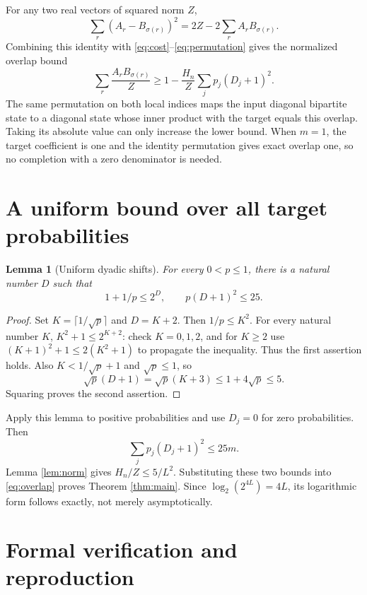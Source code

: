\documentclass[11pt]{article}
\newtheorem{lemma}[theorem]{Lemma}
\begin{document}
For any two real vectors of squared norm $Z$,
\[
 \sum_r(A_r-B_{\sigma(r)})^2=2Z-2\sum_rA_rB_{\sigma(r)}.
\]
Combining this identity with \eqref{eq:cost}--\eqref{eq:permutation} gives the normalized overlap bound
\begin{equation}
 \sum_r\frac{A_rB_{\sigma(r)}}Z
 \geq1-\frac{H_n}{Z}\sum_jp_j(D_j+1)^2.
 \label{eq:overlap}
\end{equation}
The same permutation on both local indices maps the input diagonal bipartite state to a diagonal state whose inner product with the target equals this overlap. Taking its absolute value can only increase the lower bound. When $m=1$, the target coefficient is one and the identity permutation gives exact overlap one, so no completion with a zero denominator is needed.

\section{A uniform bound over all target probabilities}

\begin{lemma}[Uniform dyadic shifts]\label{lem:shift}
For every $0<p\leq1$, there is a natural number $D$ such that
\[
 1+1/p\leq2^D,\qquad p(D+1)^2\leq25.
\]
\end{lemma}
\begin{proof}
Set $K=\lceil1/\sqrt p\rceil$ and $D=K+2$. Then $1/p\leq K^2$. For every natural number $K$, $K^2+1\leq2^{K+2}$: check $K=0,1,2$, and for $K\geq2$ use $(K+1)^2+1\leq2(K^2+1)$ to propagate the inequality. Thus the first assertion holds. Also $K<1/\sqrt p+1$ and $\sqrt p\leq1$, so
\[
 \sqrt p(D+1)=\sqrt p(K+3)\leq1+4\sqrt p\leq5.
\]
Squaring proves the second assertion.
\end{proof}

Apply this lemma to positive probabilities and use $D_j=0$ for zero probabilities. Then
\[
 \sum_jp_j(D_j+1)^2\leq25m.
\]
Lemma \ref{lem:norm} gives $H_n/Z\leq5/L^2$. Substituting these two bounds into \eqref{eq:overlap} proves Theorem \ref{thm:main}. Since $\log_2(2^{4L})=4L$, its logarithmic form follows exactly, not merely asymptotically.

\section{Formal verification and reproduction}\label{sec:lean}
\end{document}
